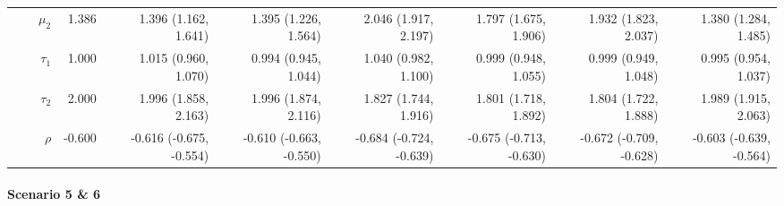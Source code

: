 \documentclass[
]{article}
\begin{document}
\begin{table}
\begin{tabular}[t]{rrrrrrrrrr}
 &  & $\mu_2$ & 1.386 & 1.396 (1.162, 1.641) & 1.395 (1.226, 1.564) & 2.046 (1.917, 2.197) & 1.797 (1.675, 1.906) & 1.932 (1.823, 2.037) & 1.380 (1.284, 1.485)\\
 &  & $\tau_1$ & 1.000 & 1.015 (0.960, 1.070) & 0.994 (0.945, 1.044) & 1.040 (0.982, 1.100) & 0.999 (0.948, 1.055) & 0.999 (0.949, 1.048) & 0.995 (0.954, 1.037)\\
 &  & $\tau_2$ & 2.000 & 1.996 (1.858, 2.163) & 1.996 (1.874, 2.116) & 1.827 (1.744, 1.916) & 1.801 (1.718, 1.892) & 1.804 (1.722, 1.888) & 1.989 (1.915, 2.063)\\
 &  & $\rho$ & -0.600 & -0.616 (-0.675, -0.554) & -0.610 (-0.663, -0.550) & -0.684 (-0.724, -0.639) & -0.675 (-0.713, -0.630) & -0.672 (-0.709, -0.628) & -0.603 (-0.639, -0.564)\\
\bottomrule
\end{tabular}
\end{table}

\hypertarget{scenario-5-6}{%
\paragraph{Scenario 5 \& 6}\label{scenario-5-6}}
\end{document}
